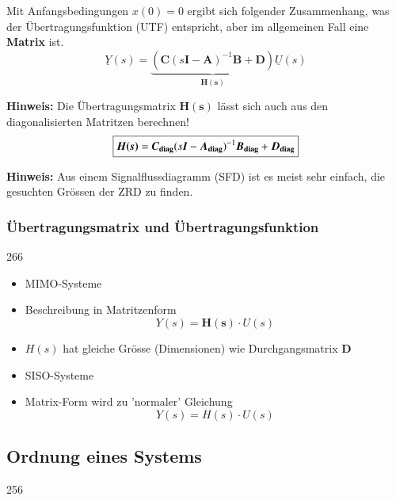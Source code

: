 Mit Anfangsbedingungen $x(0) = 0$ ergibt sich folgender Zusammenhang, was der Übertragungsfunktion (UTF) entspricht,
aber im allgemeinen Fall eine \textbf{Matrix} ist.
$$ \boxed{ \underline{Y}(s) = \underbrace{(\bm{C}(s \bm{I} - \bm{A})^{-1} \bm{B} + \bm{D} )}_{\bm{H(s)}} \underline{U}(s) } $$

\textbf{Hinweis:} Die Übertragungsmatrix $\bm{H(s)}$ lässt sich auch aus den diagonalisierten Matritzen berechnen!
$$ \boxed{ \bm{H(s)} = \bm{C_{\rm diag}}(s \bm{I} - \bm{A_{\rm diag}})^{-1} \bm{B_{\rm diag}} + \bm{D_{\rm diag}} } $$

\textbf{Hinweis:} Aus einem Signalflussdiagramm (SFD) ist es meist sehr einfach, die gesuchten Grössen der ZRD zu finden.


\subsubsection{Übertragungsmatrix und Übertragungsfunktion}{266}

\begin{minipage}[t]{0.48\columnwidth}
    \begin{center}
        \textbf{}
    \end{center}
    \begin{itemize}
        \item MIMO-Systeme
        \item Beschreibung in Matritzenform
            $$ Y(s) = \bm{H(s)} \cdot U(s) $$
        \item  $H(s)$ hat gleiche Grösse (Dimensionen) wie Durchgangsmatrix $\bm{D}$
    \end{itemize}
\end{minipage}
\hfill
\begin{minipage}[t]{0.48\columnwidth}
    \begin{center}
        \textbf{}
    \end{center}
        \begin{itemize}
            \item SISO-Systeme
            \item Matrix-Form wird zu 'normaler' Gleichung
            $$ Y(s) = H(s) \cdot U(s) $$
        \end{itemize}
\end{minipage}


\subsection{Ordnung eines Systems}{256}

